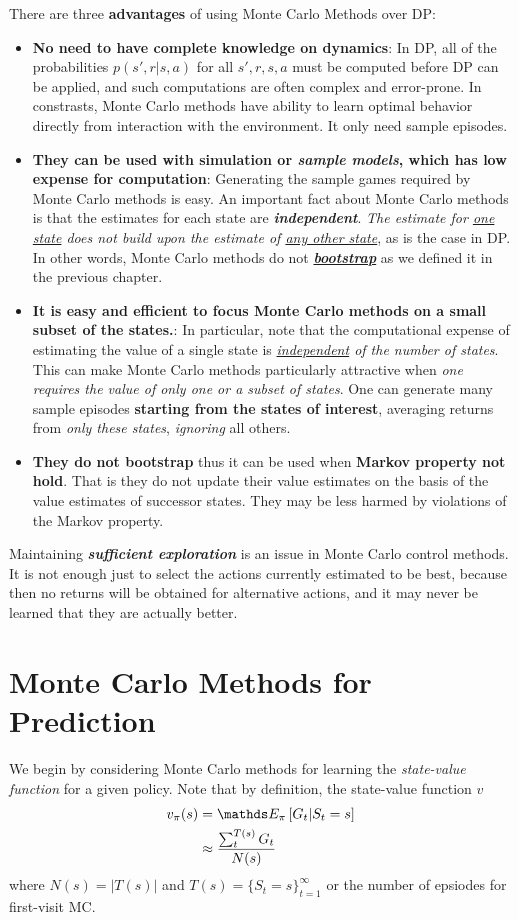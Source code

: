 \documentclass[11pt]{article}
\begin{document}
There are three \textbf{advantages} of using Monte Carlo Methods over DP:
\begin{itemize}
\item \textbf{No need to have complete knowledge on dynamics}:  In DP, all of the probabilities $p(s', r|s, a)$ for all $s', r, s, a$ must be computed before DP can be applied, and such computations are often complex and error-prone. In constrasts, Monte Carlo methods have ability to learn optimal behavior directly from interaction with the environment. It only need sample episodes. 

\item \textbf{They can be used with simulation or \emph{sample models}, which has low expense for computation}: Generating the sample games required by Monte Carlo methods is easy. An important fact about Monte Carlo methods is that the estimates for each state are \textbf{\emph{independent}}. \emph{The estimate for \underline{one state} does not build upon the estimate of \underline{any other state}}, as is the case in DP. In other words, Monte Carlo methods do not \emph{\textbf{\underline{bootstrap}}} as we defined it in the previous chapter.  

\item \textbf{It is easy and efficient to focus Monte Carlo methods on a small subset of the states.}: In particular, note that the computational expense of estimating the value of a single state is \emph{\underline{independent} of the number of states}. This can make Monte Carlo methods particularly attractive when \emph{one requires the value of only one or a subset of states}. One can generate many sample episodes \textbf{starting from the states of interest}, averaging returns from \emph{only these states}, \emph{ignoring} all others. 

\item \textbf{They do not bootstrap} thus it can be used when \textbf{Markov property not hold}. That is they do not update their value estimates on the basis of the value estimates of successor states. They may be less harmed by violations of the Markov property. 
\end{itemize}

Maintaining \emph{\textbf{sufficient exploration}} is an issue in Monte Carlo control methods. It is not enough just to select the actions currently estimated to be best, because then no returns will be obtained for alternative actions, and it may never be learned that they are actually better. 

\section{Monte Carlo Methods for Prediction}
We begin by considering Monte Carlo methods for learning the \emph{state-value function} for a given policy. Note that by definition, the state-value function $v$ 
\begin{align*}
v_{\pi}(s) &= \E{\pi}{G_{t} | S_{t} = s} \\
&\approx \frac{\sum_{t}^{T(s)} G_{t}}{N(s)}\, 
\end{align*} where $N(s) = |T(s)|$ and $T(s) = \{S_{t}=s\}_{t=1}^{\infty}$ or the number of epsiodes for first-visit MC.
\end{document}
